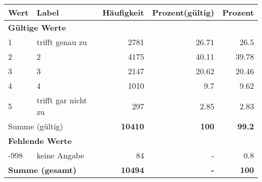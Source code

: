      \begin{longtable}{lXrrr}
     \toprule
     \textbf{Wert} & \textbf{Label} & \textbf{Häufigkeit} & \textbf{Prozent(gültig)} & \textbf{Prozent} \\
     \endhead
     \midrule
     \multicolumn{5}{l}{\textbf{Gültige Werte}}\\

     1 &
     \multicolumn{1}{X}{ trifft genau zu   } &


       \num{2781} &
       \num[round-mode=places,round-precision=2]{26,71} &
         \num[round-mode=places,round-precision=2]{26,5} \\

     2 &
     \multicolumn{1}{X}{ 2   } &


       \num{4175} &
       \num[round-mode=places,round-precision=2]{40,11} &
         \num[round-mode=places,round-precision=2]{39,78} \\

     3 &
     \multicolumn{1}{X}{ 3   } &


       \num{2147} &
       \num[round-mode=places,round-precision=2]{20,62} &
         \num[round-mode=places,round-precision=2]{20,46} \\

     4 &
     \multicolumn{1}{X}{ 4   } &


       \num{1010} &
       \num[round-mode=places,round-precision=2]{9,7} &
         \num[round-mode=places,round-precision=2]{9,62} \\

     5 &
     \multicolumn{1}{X}{ trifft gar nicht zu   } &


       \num{297} &
       \num[round-mode=places,round-precision=2]{2,85} &
         \num[round-mode=places,round-precision=2]{2,83} \\
     \midrule
     \multicolumn{2}{l}{Summe (gültig)} &
       \textbf{\num{10410}} &
     \textbf{100} &
       \textbf{\num[round-mode=places,round-precision=2]{99,2}} \\
     \multicolumn{5}{l}{\textbf{Fehlende Werte}}\\
       -998 &
       keine Angabe &
         \num{84} &
        - &
         \num[round-mode=places,round-precision=2]{0,8} \\
     \midrule
     \multicolumn{2}{l}{\textbf{Summe (gesamt)}} &
          \textbf{\num{10494}} &
        \textbf{-} &
        \textbf{100} \\
     \bottomrule
     \end{longtable}
     
